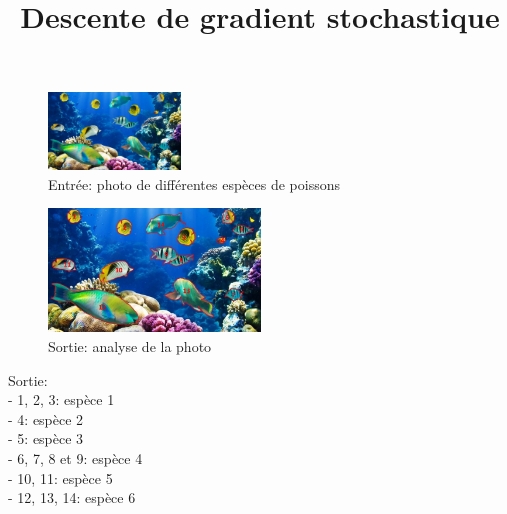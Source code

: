 \documentclass{beamer}
\begin{document}
	\title{Descente de gradient stochastique}
	\date{}
	\maketitle

	\newpage
	
	\begin{figure}
	\centering
			\includegraphics[width=100pt]{pictures/fish.jpg}
		\caption{Entrée: photo de différentes espèces de poissons}
	\end{figure}
	
		\begin{figure}
	\centering
			\includegraphics[width=160pt]{pictures/fishAll.jpg}
		\caption{Sortie: analyse de la photo}
	\end{figure}
	
	\raggedright\hspace{0.7cm}Sortie:\\
	\hspace{0.6cm}- 1, 2, 3: espèce 1\\
	\hspace{0.6cm}- 4: espèce 2\\
	\hspace{0.6cm}- 5: espèce 3\\
	\hspace{0.6cm}- 6, 7, 8 et 9: espèce 4\\
	\hspace{0.6cm}- 10, 11: espèce 5\\
	\hspace{0.6cm}- 12, 13, 14: espèce 6
					
	\newpage
	
\end{document}
